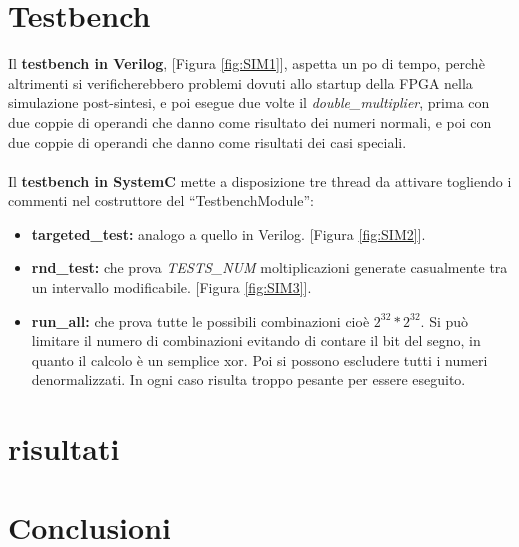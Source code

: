 \documentclass[]{IEEEtran}
\begin{document}
\section{Testbench}
Il \textbf{testbench in Verilog}, [Figura \ref{fig:SIM1}], aspetta un po di tempo, perchè altrimenti si verificherebbero problemi dovuti allo startup della FPGA nella simulazione post-sintesi, e poi esegue due volte il \textit{double\_multiplier}, prima con due coppie di operandi che danno come risultato dei numeri normali, e poi con due coppie di operandi che danno come risultati dei casi speciali. \\\\


Il \textbf{testbench in SystemC} mette a disposizione tre thread da attivare togliendo i commenti nel costruttore del ``TestbenchModule'':
\begin{itemize}
    \item \textbf{targeted\_test:} analogo a quello in Verilog. [Figura \ref{fig:SIM2}].
    \item \textbf{rnd\_test:} che prova \textit{TESTS\_NUM} moltiplicazioni generate casualmente tra un intervallo modificabile. [Figura \ref{fig:SIM3}].
    \item \textbf{run\_all:} che prova tutte le possibili combinazioni cioè \(2^{32} * 2^{32}\). Si può limitare il numero di combinazioni evitando di contare il bit del segno, in quanto il calcolo è un semplice xor. Poi si possono escludere tutti i numeri denormalizzati. In ogni caso risulta troppo pesante per essere eseguito.
\end{itemize}

















\section{risultati}

\section{Conclusioni}




\appendix
\end{document}
